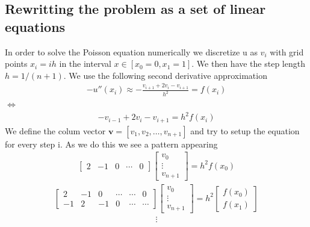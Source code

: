 \documentclass[american,a4paper,12pt]{article}
\renewcommand{\vec}[1]{\mathbf{#1}} %
\begin{document}
  \subsection{Rewritting the problem as a set of linear equations}
    In order to solve the Poisson equation numerically we discretize u as $v_i$ with grid points $x_i = ih$ in the interval $x \in [x_0 = 0,x_1 = 1]$. We then have the step length $h = 1/(n + 1)$. We use the following second derivative approximation
    \begin{align*}
      -u''(x_i) \approx -\frac{v_{i+1} + 2v_i - v_{i+1}}{h^2} =  f(x_i)
    \end{align*}
    $\Longleftrightarrow$
    \begin{align*}
      -v_{i-1} + 2v_i - v_{i+1} = h^2f(x_i)
    \end{align*}
    We define the colum vector $\vec{v} = [v_1, v_2, \hdots, v_{n+1}]$ and try to setup the equation for every step i. As we do this we see a pattern appearing
    \begin{align*}
          \begin{bmatrix}
            2 & -1 & 0 & \cdots & 0
          \end{bmatrix}
          \begin{bmatrix}
            v_0 \\
            \vdots \\
            v_{n+1}
          \end{bmatrix}
    = h^2f(x_0)
    \end{align*}
    \begin{align*}
          \begin{bmatrix}
            2 & -1 & 0 & \cdots & \cdots & 0 \\
            -1 & 2 & -1 & 0 & \cdots & \cdots
          \end{bmatrix}
          \begin{bmatrix}
            v_0 \\
            \vdots \\
            v_{n+1}
          \end{bmatrix}
    = h^2
          \begin{bmatrix}
            f(x_0) \\
            f(x_1)
          \end{bmatrix}
    \end{align*}
    \begin{align*}
      \vdots
    \end{align*}
\end{document}
